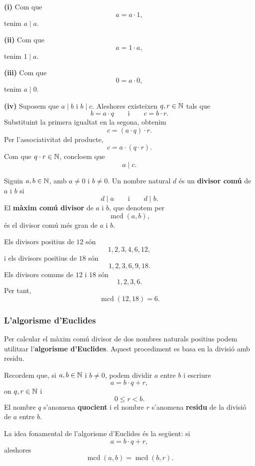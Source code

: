 \begin{prova}
\textbf{(i)} Com que
\[
a=a\cdot 1,
\]
tenim $a\mid a$.

\medskip

\noindent\textbf{(ii)} Com que
\[
a=1\cdot a,
\]
tenim $1\mid a$.

\medskip

\noindent\textbf{(iii)} Com que
\[
0=a\cdot 0,
\]
tenim $a\mid 0$.

\medskip

\noindent\textbf{(iv)} Suposem que $a\mid b$ i $b\mid c$. Aleshores existeixen $q,r\in\mathbb{N}$ tals que
\[
b=a\cdot q
\qquad\text{i}\qquad
c=b\cdot r.
\]
Substituint la primera igualtat en la segona, obtenim
\[
c=(a\cdot q)\cdot r.
\]
Per l'associativitat del producte,
\[
c=a\cdot(q\cdot r).
\]
Com que $q\cdot r\in\mathbb{N}$, concloem que
\[
a\mid c.
\]
\end{prova}

\begin{definicio}
Siguin $a,b\in\mathbb{N}$, amb $a\neq 0$ i $b\neq 0$. Un nombre natural $d$ és un \textbf{divisor comú} de $a$ i $b$ si
\[
d\mid a
\qquad\text{i}\qquad
d\mid b.
\]
El \textbf{màxim comú divisor} de $a$ i $b$, que denotem per
\[
\operatorname{mcd}(a,b),
\]
és el divisor comú més gran de $a$ i $b$.
\end{definicio}

\begin{exemple}
Els divisors positius de $12$ són
\[
1,2,3,4,6,12,
\]
i els divisors positius de $18$ són
\[
1,2,3,6,9,18.
\]
Els divisors comuns de $12$ i $18$ són
\[
1,2,3,6.
\]
Per tant,
\[
\operatorname{mcd}(12,18)=6.
\]
\end{exemple}

\subsubsection{L'algorisme d'Euclides}

Per calcular el màxim comú divisor de dos nombres naturals positius podem utilitzar l'\textbf{algorisme d'Euclides}. Aquest procediment es basa en la divisió amb residu.

Recordem que, si $a,b\in\mathbb{N}$ i $b\neq 0$, podem dividir $a$ entre $b$ i escriure
\[
a=b\cdot q+r,
\]
on $q,r\in\mathbb{N}$ i
\[
0\leq r<b.
\]
El nombre $q$ s'anomena \textbf{quocient} i el nombre $r$ s'anomena \textbf{residu} de la divisió de $a$ entre $b$.

La idea fonamental de l'algorisme d'Euclides és la següent: si
\[
a=b\cdot q+r,
\]
aleshores
\[
\operatorname{mcd}(a,b)=\operatorname{mcd}(b,r).
\]

